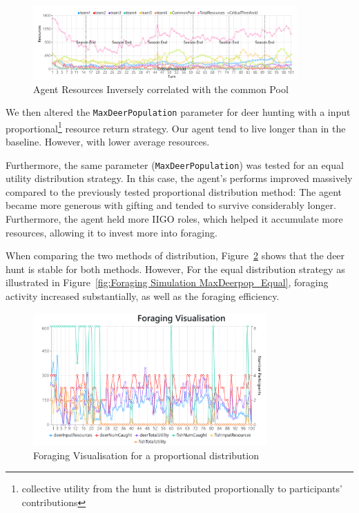 \begin{figure}[!htb]
    \centering
    \includegraphics[width=0.9\textwidth]{13_team5_agentdesign/images/Agent Resources Inveserly correlated.png}
    \caption{Agent Resources Inversely correlated with the common Pool}
    \label{fig:Agent Resources Inversely correlated with the common Pool}
\end{figure}


We then altered the \texttt{MaxDeerPopulation} parameter for deer hunting with a input proportional\footnote{collective utility from the hunt is distributed proportionally to participants' contributions} resource return strategy. Our agent tend to live longer than in the baseline. However, with lower average resources.

Furthermore, the same parameter (\texttt{MaxDeerPopulation}) was tested for an equal utility distribution strategy. In this case, the agent's performs improved massively compared to the previously tested proportional distribution method: The agent became more generous with gifting and tended to survive considerably longer. Furthermore, the agent held more IIGO roles, which helped it accumulate more resources, allowing it to invest more into foraging.

When comparing the two methods of distribution, Figure~\ref{fig:Foraging Simulation MaxDeerpop_Prob} shows that the deer hunt is stable for both methods. However, For the equal distribution strategy as illustrated in Figure~\ref{fig:Foraging Simulation MaxDeerpop_Equal}, foraging activity increased substantially, as well as the foraging efficiency. 

\begin{figure}[!htb]
    \centering
    \includegraphics[width=0.8\textwidth]{13_team5_agentdesign/images/Foraging Simulation MaxDeerpop_Prob.PNG}
    \caption{Foraging Visualisation for a proportional distribution}
    \label{fig:Foraging Simulation MaxDeerpop_Prob}
\end{figure}

